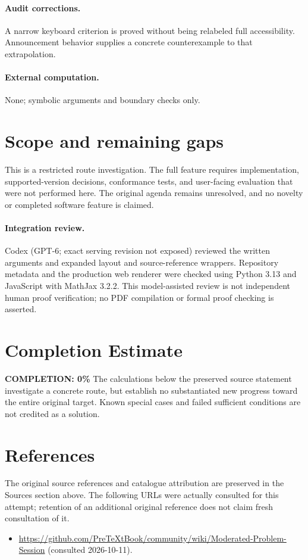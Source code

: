 \documentclass[11pt]{article}
\begin{document}
\paragraph{Audit corrections.} A narrow keyboard criterion is proved without being relabeled full accessibility. Announcement behavior supplies a concrete counterexample to that extrapolation.
\paragraph{External computation.} None; symbolic arguments and boundary checks only.
\section{Scope and remaining gaps}
This is a restricted route investigation. The full feature requires implementation, supported-version decisions, conformance tests, and user-facing evaluation that were not performed here. The original agenda remains unresolved, and no novelty or completed software feature is claimed.
\paragraph{Integration review.} Codex (GPT-6; exact serving revision not exposed) reviewed the written arguments and expanded layout and source-reference wrappers. Repository metadata and the production web renderer were checked using Python 3.13 and JavaScript with MathJax 3.2.2. This model-assisted review is not independent human proof verification; no PDF compilation or formal proof checking is asserted.

\section{Completion Estimate}
\noindent\textbf{COMPLETION: 0\%}
The calculations below the preserved source statement investigate a concrete route,
but establish no substantiated new progress toward the entire original target.
Known special cases and failed sufficient conditions are not credited as a solution.
\section{References}
The original source references and catalogue attribution are preserved in the
Sources section above. The following URLs were actually consulted for this attempt;
retention of an additional original reference does not claim fresh consultation of it.
\begin{itemize}
\item \url{https://github.com/PreTeXtBook/community/wiki/Moderated-Problem-Session} (consulted 2026-10-11). 
\end{itemize}
\end{document}
